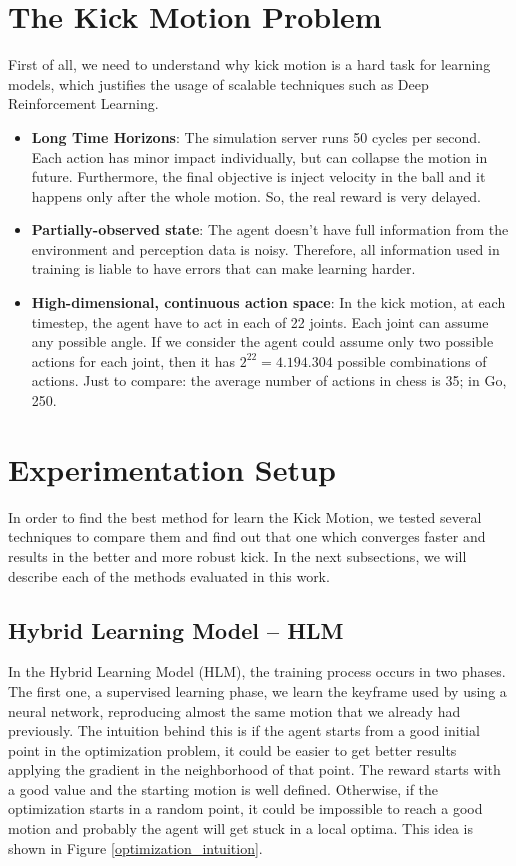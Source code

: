 \section{The Kick Motion Problem}

First of all, we need to understand why kick motion is a hard task for learning models, which justifies the usage of scalable techniques such as Deep Reinforcement Learning.

\begin{itemize}
	\item \textbf{Long Time Horizons}: The simulation server runs 50 cycles per second. Each action has minor impact individually, but can collapse the motion in future. Furthermore, the final objective is inject velocity in the ball and it happens only after the whole motion. So, the real reward is very delayed.
	
	\item \textbf{Partially-observed state}: The agent doesn't have full information from the environment and perception data is noisy. Therefore, all information used in training is liable to have errors that can make learning harder.
	
	\item \textbf{High-dimensional, continuous action space}: In the kick motion, at each timestep, the agent have to act in each of 22 joints. Each joint can assume any possible angle. If we consider the agent could assume only two possible actions for each joint, then it has $2^{22} = 4.194.304$ possible combinations of actions. Just to compare: the average number of actions in chess is 35; in Go, 250.
\end{itemize}
\section{Experimentation Setup}\label{sec:experimentation_setup}
In order to find the best method for learn the Kick Motion, we tested several techniques to compare them and find out that one which converges faster and results in the better and more robust kick. In the next subsections, we will describe each of the methods evaluated in this work.

\subsection{Hybrid Learning Model -- HLM}
In the Hybrid Learning Model (HLM), the training process occurs in two phases. The first one, a supervised learning phase, we learn the keyframe used by using a neural network, reproducing almost the same motion that we already had previously. The intuition behind this is if the agent starts from a good initial point in the optimization problem, it could be easier to get better results applying the gradient in the neighborhood of that point. The reward starts with a good value and the starting motion is well defined. Otherwise, if the optimization starts in a random point, it could be impossible to reach a good motion and probably the agent will get stuck in a local optima. This idea is shown in Figure \ref{optimization_intuition}.


